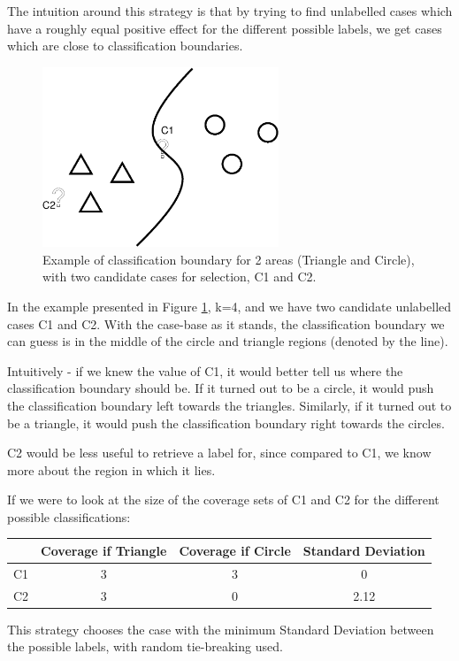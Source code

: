 \documentclass[a4paper,11pt]{report}
\begin{document}
The intuition around this strategy is that by trying to find unlabelled cases which have a roughly equal positive effect for the different possible labels, we get cases which are close to classification boundaries.

\begin{figure}[h!] \centering
\includegraphics[width=200pt]{./Drawn/NCADMin}
\caption{Example of classification boundary for 2 areas (Triangle and Circle), with two candidate cases for selection, C1 and C2.}
\label{fig:ncadmin}
\end{figure}

In the example presented in Figure \ref{fig:ncadmin}, k=4, and we have two candidate unlabelled cases C1 and C2. With the case-base as it stands, the classification boundary we can guess is in the middle of the circle and triangle regions (denoted by the line).
 
Intuitively - if we knew the value of C1, it would better tell us where the classification boundary should be. If it turned out to be a circle, it would push the classification boundary left towards the triangles. Similarly, if it turned out to be a triangle, it would push the classification boundary right towards the circles. 

C2 would be less useful to retrieve a label for, since compared to C1, we know more about the region in which it lies.

If we were to look at the size of the coverage sets of C1 and C2 for the different possible classifications:

\begin{tabular}{|c|c|c|c|}
\cline{2-4} 
\multicolumn{1}{c|}{} & Coverage if Triangle & Coverage if Circle & Standard Deviation\tabularnewline
\hline 
C1 & 3 & 3 & 0\tabularnewline
\hline 
C2 & 3 & 0 & 2.12\tabularnewline
\hline 
\end{tabular}

\vspace{10pt}

This strategy chooses the case with the minimum Standard Deviation between the possible labels, with random tie-breaking used.
\end{document}
